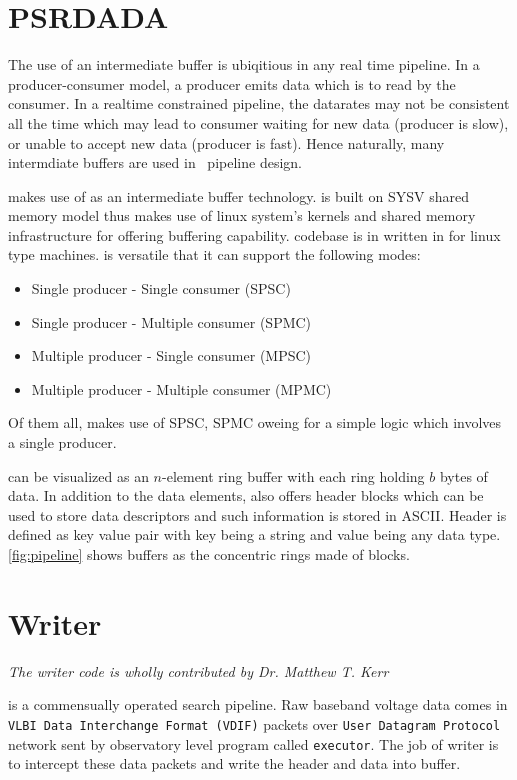 \section {PSRDADA}
\par The use of an intermediate buffer is ubiqitious in any real time pipeline. In a producer-consumer model, a producer emits data which is to read by the consumer. 
In a realtime constrained pipeline, the datarates may not be consistent all the time which may lead to consumer waiting for new data (producer is slow), or unable to accept new data (producer is fast).
Hence naturally, many intermdiate buffers are used in \vf~pipeline design.

\par \vf makes use of \dada as an intermediate buffer technology. \dada is built on SYSV shared memory model thus makes use of linux system's kernels and shared memory infrastructure for offering buffering capability. 
\dada codebase is in written in \cc for linux type machines. \dada is versatile that it can support the following modes:
\begin{itemize}
\item Single producer - Single consumer (SPSC)
\item Single producer - Multiple consumer (SPMC)
\item Multiple producer - Single consumer (MPSC)
\item Multiple producer - Multiple consumer (MPMC)
\end{itemize}
Of them all, \vf makes use of SPSC, SPMC oweing for a simple logic which involves a single producer.

\par \dada can be visualized as an $n$-element ring buffer with each ring holding $b$ bytes of data. In addition to the data elements, \dada also offers header blocks which can be used to store data descriptors and such information is stored in ASCII.
Header is defined as key value pair with key being a string and value being any data type.
\autoref{fig:pipeline} shows \dada buffers as the concentric rings made of blocks.

\section {Writer} 
\hfill \emph {The writer code is wholly contributed by Dr. Matthew T. Kerr}

\par \vf is a commensually operated search pipeline. Raw baseband voltage data comes in \texttt{VLBI Data Interchange Format (VDIF)} packets over
\texttt{User Datagram Protocol} network sent by observatory level program called \texttt{executor}. The job of writer is to intercept these data packets and write the header and data into \dada buffer.

